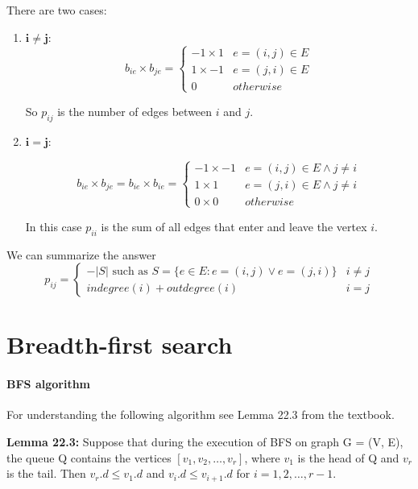 \documentclass{book}
\begin{document}
	There are two cases:
	\begin{enumerate}
		\item $\boldsymbol{i \ne j:}$
			\begin{equation*}
			b_{ie} \times b_{je} = \begin{cases}
			-1 \times 1 & e = (i, j) \in E \\
			1 \times -1 & e = (j, i) \in E \\
			0 & otherwise
			\end{cases}
			\end{equation*}
			
			So $p_{ij}$ is the number of edges between $i$ and $j$.
			
		\item $\boldsymbol{i = j:}$
		
			\begin{equation*}
			b_{ie} \times b_{je} = b_{ie} \times b_{ie} = \begin{cases}
			-1 \times -1 & e = (i, j) \in E \land j \ne i \\
			1 \times 1 & e = (j, i) \in E \land j \ne i \\
			0 \times 0 & otherwise
			\end{cases}
			\end{equation*}
			
			In this case $p_{ii}$ is the sum of all edges that enter and leave the vertex $i$.		
	\end{enumerate}
	We can summarize the answer
	\begin{equation*}
		p_{ij} = \begin{cases}
		-|S| \text{ such as } S = \{e \in E : e = (i, j) \lor e = (j, i)\} & i \ne j \\
		indegree(i) + outdegree(i) & i = j
		\end{cases}
	\end{equation*}
	
	\section{Breadth-first search}
	\label{psec:BFSAlgorithm}
	\paragraph{BFS algorithm}
	For understanding the following algorithm see Lemma 22.3 from the textbook.
	
	\textbf{Lemma 22.3: } Suppose that during the execution of BFS on graph G = (V, E), the queue Q contains the vertices $[v_1, v_2, \dots , v_r]$, where $v_1$ is the head of Q and $v_r$ is the tail. Then $v_r.d \le v_1.d$ and $v_i.d \le v_{i+1}.d$ for $i = 1, 2, \dots, r - 1$.\\
			
\end{document}
